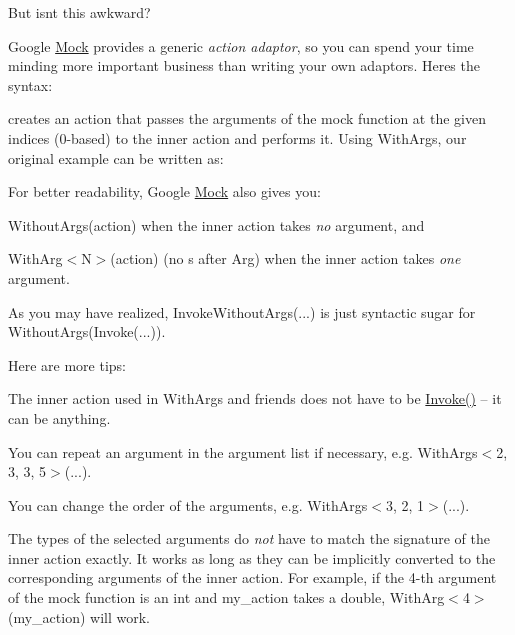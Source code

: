 But isn\textquotesingle{}t this awkward?

Google \mbox{\hyperlink{class_mock}{Mock}} provides a generic {\itshape action adaptor}, so you can spend your time minding more important business than writing your own adaptors. Here\textquotesingle{}s the syntax\+:


\begin{DoxyCode}{0}
\end{DoxyCode}


creates an action that passes the arguments of the mock function at the given indices (0-\/based) to the inner {\ttfamily action} and performs it. Using {\ttfamily With\+Args}, our original example can be written as\+:


\begin{DoxyCode}{0}
\end{DoxyCode}


For better readability, Google \mbox{\hyperlink{class_mock}{Mock}} also gives you\+:


\begin{DoxyItemize}
\item {\ttfamily Without\+Args(action)} when the inner {\ttfamily action} takes {\itshape no} argument, and
\item {\ttfamily With\+Arg$<$N$>$(action)} (no {\ttfamily s} after {\ttfamily Arg}) when the inner {\ttfamily action} takes {\itshape one} argument.
\end{DoxyItemize}

As you may have realized, {\ttfamily Invoke\+Without\+Args(...)} is just syntactic sugar for {\ttfamily Without\+Args(\+Invoke(...))}.

Here are more tips\+:


\begin{DoxyItemize}
\item The inner action used in {\ttfamily With\+Args} and friends does not have to be {\ttfamily \mbox{\hyperlink{namespacetesting_af5cacf4475557b5a3e37af3836564235}{Invoke()}}} -- it can be anything.
\item You can repeat an argument in the argument list if necessary, e.\+g. {\ttfamily With\+Args$<$2, 3, 3, 5$>$(...)}.
\item You can change the order of the arguments, e.\+g. {\ttfamily With\+Args$<$3, 2, 1$>$(...)}.
\item The types of the selected arguments do {\itshape not} have to match the signature of the inner action exactly. It works as long as they can be implicitly converted to the corresponding arguments of the inner action. For example, if the 4-\/th argument of the mock function is an {\ttfamily int} and {\ttfamily my\+\_\+action} takes a {\ttfamily double}, {\ttfamily With\+Arg$<$4$>$(my\+\_\+action)} will work.
\end{DoxyItemize}

